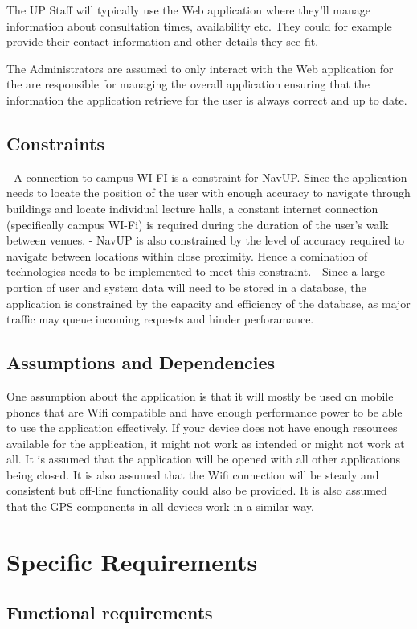 \documentclass[12pt]{article}
\begin{document}
	The UP Staff will typically use the Web application where they'll manage information about consultation times, availability etc. They could for example provide their contact information and other details they see fit.
	
	The Administrators are assumed to only interact with the Web application for the are responsible for managing the overall application ensuring that the information the application retrieve for the user is always correct and up to date.
	\subsection{Constraints}
	- A connection to campus WI-FI is a constraint for NavUP. Since the application needs to locate the position of the user with enough accuracy to navigate through buildings and locate individual lecture halls, a constant internet connection (specifically campus WI-Fi) is required during the duration of the user’s walk between venues.
	- NavUP is also constrained by the level of accuracy required to navigate between locations within close proximity. Hence a comination of technologies needs to be implemented to meet this constraint.
	- Since a large portion of user and system data will need to be stored in a database, the application is constrained by the capacity and efficiency of the database, as major traffic may queue incoming requests and hinder perforamance.
	
	\subsection{Assumptions and Dependencies}
	One assumption about the application is that it will mostly be used on mobile phones that are Wifi compatible and have enough performance power to be able to use the application effectively. If your device does not have enough resources available for the application, it might not work as intended or might not work at all. It is assumed that the application will be opened with all other applications being closed. It is also assumed that the Wifi connection will be steady and consistent but off-line functionality could also be provided. It is also assumed that the GPS components in all devices work in a similar way.
	\section{Specific Requirements}
	\subsection{Functional requirements}
\end{document}
